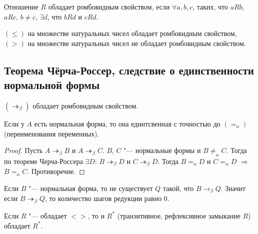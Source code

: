 \begin{definition}
	Отношение $R$ обладает ромбовидным свойством, если $\forall a,b,c$, таких, что $aRb$, $aRc$, $b\neq{}c$, $\exists{}d$, что $bRd$ и $cRd$.
\end{definition}

\begin{example}
	$(\leq)$ на множестве натуральных чисел обладает ромбовидным свойством,
	$(>)$ на множестве натуральных чисел не обладает ромбовидным свойством.
\end{example}

\subsection{Теорема Чёрча-Россер, следствие о единственности нормальной формы}

\begin{theorem}
	$(\twoheadrightarrow_{\beta})$ обладает ромбовидным свойством.
\end{theorem}


\begin{cons}
	Если у $A$ есть нормальная форма, то она единтсвенная с точностью до $(=_{\alpha})$ (переименования переменных).
\end{cons}

\begin{proof}
	Пусть $A\twoheadrightarrow_{\beta}B$ и $A\twoheadrightarrow_{\beta}C$. $B$, $C$ "--- нормальные формы и $B\neq_{\alpha}C$. 
	Тогда по теореме Черча-Россера $\exists{}D$: $B\twoheadrightarrow_{\beta}D$ и $C\twoheadrightarrow_{\beta}D$. Тогда $B=_{\alpha}D$ и $C=_{\alpha} D$ $\Rightarrow$ $B=_{\alpha}C$. Противоречие.
\end{proof}

\begin{lemma}
	Если $B$ "--- нормальная форма, то не существует $Q$ такой, что $B\to_{\beta}Q$. Значит если $B\twoheadrightarrow_{\beta}Q$, то количество шагов редукции равно 0.
\end{lemma}

\begin{lemma}
	 \label{refl}
	Если $R$ "--- обладает $<>$, то и $R^{*}$ (транзитивное, рефлексивное замыкание $R$) обладает $R^{*}$.
\end{lemma}

